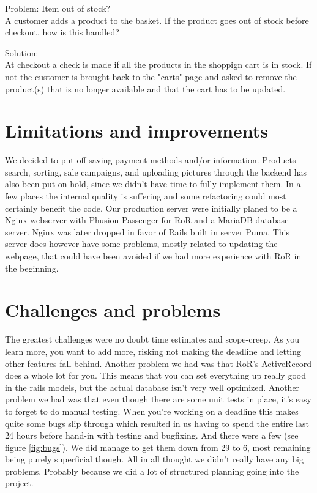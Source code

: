 \documentclass[paper=a4, fontsize=11pt]{report} %
\begin{document}
	Problem: Item out of stock? \\
		A customer adds a product to the basket. If the product goes out of
		stock before checkout, how is this handled?

	Solution: \\
		At checkout a check is made if all the products in the shoppign cart 
        is in stock. If not the customer is brought back to the "carts" page 
        and asked to remove the product(s) that is no longer available and
        that the cart has to be updated.

\section*{Limitations and improvements}

	We decided to put off saving payment methods and/or information. 
	Products search, sorting, sale campaigns, and uploading pictures
	through the backend has also been put on hold, since we didn't have
	time to fully implement them. In a few places the internal quality is
    suffering and some refactoring could most certainly benefit the code.
    Our production server were initially planed to be a Nginx webserver with 
    Phusion Passenger for RoR and a MariaDB database server. Nginx was later 
    dropped in favor of Rails built in server Puma. This server does however 
    have some problems, mostly related to updating the webpage, that could 
    have been avoided if we had more experience with RoR in the beginning. 

\section*{Challenges and problems}

	The greatest challenges were no doubt time estimates and scope-creep. As
    you learn more, you want to add more, risking not making the deadline and
    letting other features fall behind. Another problem we had was that RoR's
    ActiveRecord does a whole lot for you. This means that you can set
    everything up really good in the rails models, but the actual database
    isn't very well optimized.
	Another problem we had was that even though there are some unit tests in
    place, it's easy to forget to do manual testing. When you're working on a
    deadline this makes quite some bugs slip through which resulted in us
    having to spend the entire last 24 hours before hand-in with testing and
    bugfixing. And there were a few (see figure \ref{fig:bugs}). We did manage
    to get them down from 29 to 6, most remaining being purely superficial though.
	All in all thought we didn't really have any big problems. Probably because
    we did a lot of structured planning going into the project.
\end{document}
